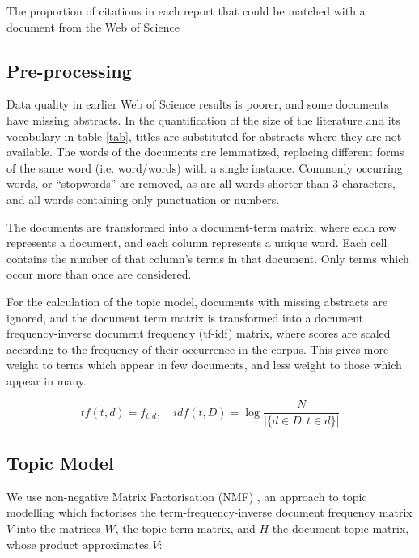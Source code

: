 \documentclass{article}
\begin{document}
\begin{linenumbers}
		\begin{table}[htp]
			\begin{center}
		
	\caption{The proportion of citations in each report that could be matched with a document from the Web of Science}
	\label{ipcc-matching}
	\end{center}
\end{table}
	
		
	\subsection*{Pre-processing}
	
	Data quality in earlier Web of Science results is poorer, and some documents have missing abstracts. In the quantification of the size of the literature and its vocabulary in table \ref{tab}, titles are substituted for abstracts where they are not available.  The words of the documents are lemmatized, replacing different forms of the same word (i.e. word/words) with a single instance. Commonly occurring words, or ``stopwords'' are removed, as are all words shorter than 3 characters, and all words containing only punctuation or numbers.
	
	The documents are transformed into a document-term matrix, where each row represents a document, and each column represents a unique word.  Each cell contains the number of that column's terms in that document. Only terms which occur more than once are considered.
	
	For the calculation of the topic model, documents with missing abstracts are ignored, and the document term matrix is transformed into a document
	frequency-inverse document frequency (tf-idf) matrix, where scores are scaled according to the frequency of their occurrence in the corpus. This gives more weight to terms which appear in few documents, and less weight to those which appear in many.
	
	\begin{equation}
	tf(t,d) = f_{t,d} \mathrm{,}\quad idf(t,D) = \log\frac{N}{|\{d \in D:t \in d\}|}
	\end{equation} 
	
	\subsection*{Topic Model}
	
	We use non-negative Matrix Factorisation (NMF) \cite{Lee1999}, an approach to topic modelling which factorises the term-frequency-inverse document frequency matrix \( V \) into the matrices \(W\), the topic-term matrix, and \( H \) the document-topic matrix, whose product approximates \(V\):
	

\end{linenumbers}
\end{document}
